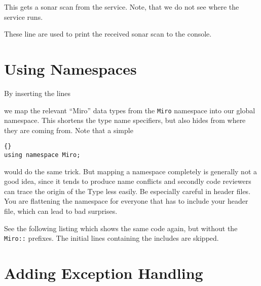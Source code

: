 

This gets a sonar scan from the service. Note, that we do not see where 
the service runs.



These line are used to print the received sonar scan to the console.

%




\section{Using Namespaces}

By inserting the lines



we map the relevant ``Miro'' data types from the \lstinline!Miro!
namespace into our global namespace. This shortens the type name
specifiers, but also hides from where they are coming from. Note that
a simple

\begin{lstlisting}[frame=tb]{}
using namespace Miro;
\end{lstlisting}

would do the same trick. But mapping a namespace completely is
generally not a good idea, since it tends to produce name conflicts
and secondly code reviewers can trace the origin of the Type less
easily. Be especially careful in header files. You are flattening the
namespace for everyone that has to include your header file, which can
lead to bad surprises.

See the following listing which shows the same code again, but without
the \lstinline!Miro::! prefixes. The initial lines containing the includes
are skipped.




\section{Adding Exception Handling}

